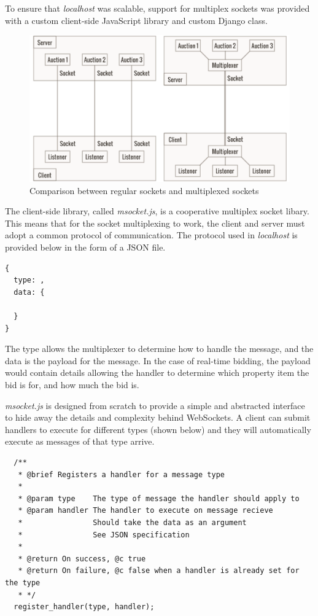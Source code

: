 To ensure that \emph{localhost} was scalable, support for multiplex sockets
was provided with a custom client-side JavaScript library and custom Django
class.
\begin{figure}[!h]
  \includegraphics[width=\linewidth]{assets/msocket.png}
  \caption{Comparison between regular sockets and multiplexed sockets}
  \label{fig:msocket}
\end{figure}
The client-side library, called \emph{msocket.js}, is a cooperative multiplex
socket libary. This means that for the socket multiplexing to work, the client
and server must adopt a common protocol of communication. The protocol used
in \emph{localhost} is provided below in the form of a JSON file.
\begin{lstlisting}
{
  type: ,
  data: {

  }
}
\end{lstlisting}

The type allows the multiplexer to determine how to handle the message, and
the data is the payload for the
message. In the case of real-time bidding, the payload would contain details
allowing the handler to determine which property item the bid is for, and how
much the bid is.

\emph{msocket.js} is designed from scratch to provide a simple and abstracted
interface to hide away the details and complexity behind WebSockets. A client
can submit handlers to execute for different types (shown below) and they will
automatically execute as messages of that type arrive.
\begin{lstlisting}
  /**
   * @brief Registers a handler for a message type
   *
   * @param type    The type of message the handler should apply to
   * @param handler The handler to execute on message recieve
   *                Should take the data as an argument
   *                See JSON specification
   *
   * @return On success, @c true
   * @return On failure, @c false when a handler is already set for the type
   * */
  register_handler(type, handler);
\end{lstlisting}


